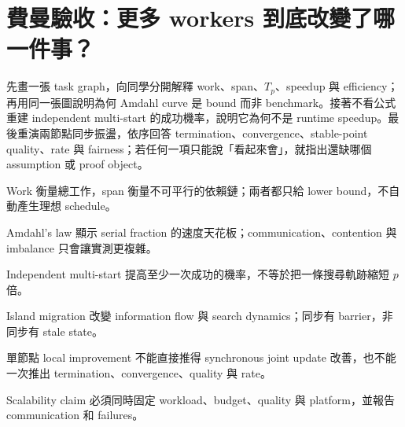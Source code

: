 \documentclass[11pt,a4paper,oneside,openany]{book}
\begin{document}
\section{費曼驗收：更多 workers 到底改變了哪一件事？}
\begin{feynmancheck}
先畫一張 task graph，向同學分開解釋 work、span、$T_p$、speedup 與 efficiency；再用同一張圖說明為何 Amdahl curve 是 bound 而非 benchmark。接著不看公式重建 independent multi-start 的成功機率，說明它為何不是 runtime speedup。最後重演兩節點同步振盪，依序回答 termination、convergence、stable-point quality、rate 與 fairness；若任何一項只能說「看起來會」，就指出還缺哪個 assumption 或 proof object。
\end{feynmancheck}
\begin{chapterrecap}
\item Work 衡量總工作，span 衡量不可平行的依賴鏈；兩者都只給 lower bound，不自動產生理想 schedule。
\item Amdahl's law 顯示 serial fraction 的速度天花板；communication、contention 與 imbalance 只會讓實測更複雜。
\item Independent multi-start 提高至少一次成功的機率，不等於把一條搜尋軌跡縮短 $p$ 倍。
\item Island migration 改變 information flow 與 search dynamics；同步有 barrier，非同步有 stale state。
\item 單節點 local improvement 不能直接推得 synchronous joint update 改善，也不能一次推出 termination、convergence、quality 與 rate。
\item Scalability claim 必須同時固定 workload、budget、quality 與 platform，並報告 communication 和 failures。
\end{chapterrecap}
\end{document}
